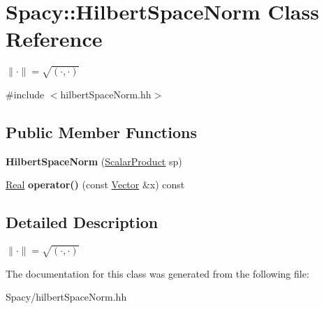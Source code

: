 \hypertarget{classSpacy_1_1HilbertSpaceNorm}{}\section{Spacy\+:\+:Hilbert\+Space\+Norm Class Reference}
\label{classSpacy_1_1HilbertSpaceNorm}


$ \|\cdot\|=\sqrt{(\cdot,\cdot)} $  




{\ttfamily \#include $<$hilbert\+Space\+Norm.\+hh$>$}

\subsection*{Public Member Functions}
\begin{DoxyCompactItemize}
\item 
\hypertarget{classSpacy_1_1HilbertSpaceNorm_aba5acc55249256d58fbba34911446ca2}{}{\bfseries Hilbert\+Space\+Norm} (\hyperlink{namespaceSpacy_aa995526aa0e3fa58aca8dd6772311cad}{Scalar\+Product} sp)\label{classSpacy_1_1HilbertSpaceNorm_aba5acc55249256d58fbba34911446ca2}

\item 
\hypertarget{classSpacy_1_1HilbertSpaceNorm_a042d8b6148297e16c0244e50799967c5}{}\hyperlink{classSpacy_1_1Real}{Real} {\bfseries operator()} (const \hyperlink{classSpacy_1_1Vector}{Vector} \&x) const \label{classSpacy_1_1HilbertSpaceNorm_a042d8b6148297e16c0244e50799967c5}

\end{DoxyCompactItemize}


\subsection{Detailed Description}
$ \|\cdot\|=\sqrt{(\cdot,\cdot)} $ 

The documentation for this class was generated from the following file\+:\begin{DoxyCompactItemize}
\item 
Spacy/hilbert\+Space\+Norm.\+hh\end{DoxyCompactItemize}
